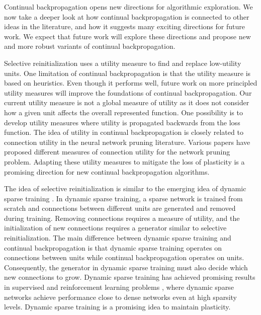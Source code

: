 \documentclass[review, number,3p]{elsarticle}
\begin{document}
Continual backpropagation opens new directions for algorithmic exploration. 
We now take a deeper look at how continual backpropagation is connected to  other ideas in the literature, and how it suggests many exciting directions for future work.
We expect that future work will explore these directions and propose new and more robust variants of continual backpropagation.

Selective reinitialization uses a utility measure to find and replace low-utility units. 
One limitation of continual backpropagation is that the utility measure is based on heuristics. 
Even though it performs well, future work on more principled utility measures will improve the foundations of continual backpropagation. 
Our current utility measure is not a global measure of utility as it does not consider how a given unit affects the overall represented function. 
One possibility is to develop utility measures where utility is propagated backwards from the loss function.
The idea of utility in continual backpropagation is closely related to connection utility in the neural network pruning literature. 
Various papers \cite{obd1989, compression2016, dst2020} have proposed different measures of connection utility for the network pruning problem. 
Adapting these utility measures to mitigate the loss of plasticity is a promising direction for new continual backpropagation algorithms. 

The idea of selective reinitialization is similar to the emerging idea of dynamic sparse training \cite{mocanu2018scalable, bellec2018deep}.
In dynamic sparse training, a sparse network is trained from scratch and connections between different units are generated and removed during training.
Removing connections requires a measure of utility, and the initialization of new connections requires a generator similar to selective reinitialization.
The main difference between dynamic sparse training and continual backpropagation is that dynamic sparse training operates on connections between units while continual backpropagation operates on units. 
Consequently, the generator in dynamic sparse training must also decide which new connections to grow.
Dynamic sparse training has achieved promising results in supervised and reinforcement learning problems \cite{chen2021chasing, sokar2021dynamic}, where dynamic sparse networks achieve performance close to dense networks even at high sparsity levels.
Dynamic sparse training is a promising idea to maintain plasticity.
\end{document}

